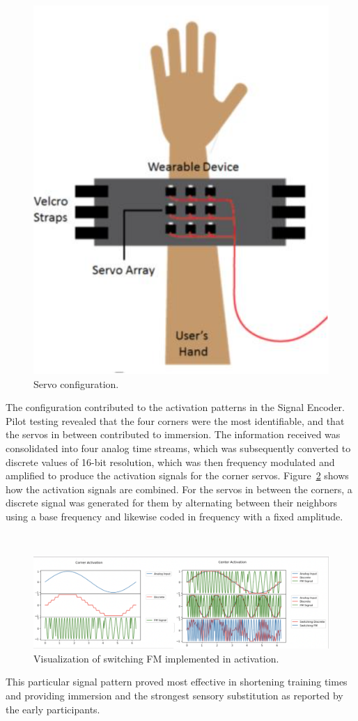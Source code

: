 \documentclass[
12pt, %
oneside, %
english, %
doublespacing, %
headsepline, %
]{MastersDoctoralThesis} %
\begin{document}
\begin{enumerate}
\,
\begin{figure}[ht]
\centering\includegraphics[width=0.4\linewidth]{images/v1device2.png}
\decoRule
\caption[Servo configuration]{Servo configuration.}
\label{fig:device2}
\end{figure}

The configuration contributed to the activation patterns in the Signal Encoder. Pilot testing revealed that the four corners were the most identifiable, and that the servos in between contributed to immersion.
The information received was consolidated into four analog time streams, which was subsequently converted to discrete values of 16-bit resolution, which was then frequency modulated \parencite{noauthor_frequency_2017} and amplified to produce the activation signals for the corner servos. Figure~\ref{fig:plot1} shows how the activation signals are combined. For the servos in between the corners, a discrete signal was generated for them by alternating between their neighbors using a base frequency and likewise coded in frequency with a fixed amplitude.

\,

\begin{figure}[h]
\centering\includegraphics[width=1.0\linewidth]{images/plot.png}
\caption[FM switching visualization]{Visualization of switching FM implemented in activation.}
\decoRule
\label{fig:plot1}
\end{figure}

This particular signal pattern proved most effective in shortening training times and providing immersion and the strongest sensory substitution as reported by the early participants.


\end{enumerate}
\end{document}
